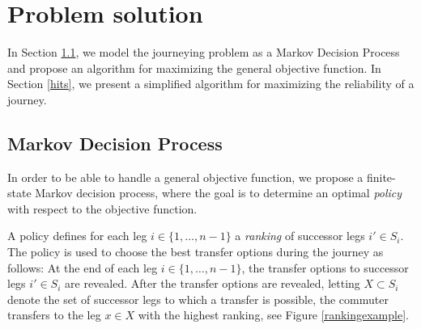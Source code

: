 \documentclass[dissertation,draft*]{aaltoseries}
\begin{document}

\section{Problem solution}
In Section \ref{mdp}, we model the journeying problem as a Markov Decision Process and propose an algorithm 
for maximizing the general objective function.
In Section \ref{hits}, we present a simplified algorithm for maximizing the reliability of a journey.

\subsection{Markov Decision Process}
\label{mdp}
In order to be able to handle a general objective function,
we propose a finite-state Markov decision process, %
where the goal is to determine an optimal \emph{policy} with respect to the objective function. 

A policy defines for each leg $i \in \{1,\ldots,n-1\}$ a \emph{ranking} of successor 
legs $i' \in S_i$. 
The policy is used to choose the best transfer options during the journey as follows:
At the end of each leg $i \in \{1,\ldots,n-1\}$, the transfer options to successor legs $i' \in S_i$ are revealed. 
After the transfer options are revealed, letting $X \subset S_i$ denote the 
set of successor legs to which a transfer is possible, the commuter transfers to the 
leg $x \in X$ with the highest ranking, see Figure \ref{rankingexample}.
\end{document}
